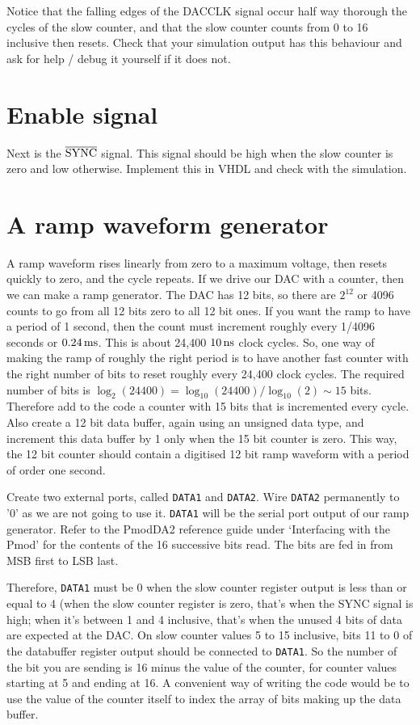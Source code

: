 \documentclass[../physical_computing.tex]{subfiles}
\begin{document}
Notice that the falling edges of the DACCLK signal occur half way thorough the cycles of the slow counter, and that the slow counter counts from 0 to 16 inclusive then resets. Check that your simulation output has this behaviour and ask for help / debug it yourself if it does not.

\section{Enable signal}
\label{sec:enable}

Next is the $\rm \overline{SYNC}$ signal. This signal should be high when the slow counter is zero and low otherwise. Implement this in VHDL and check with the simulation.

\section{A ramp waveform generator}
\label{sec:databuffer}

A ramp waveform rises linearly from zero to a maximum voltage, then resets quickly to 
zero, and the cycle repeats. If we drive our DAC with a counter, then we can make a ramp generator. The DAC has 12 bits, so there are $2^{12}$ or 4096 counts to go from all 12 bits zero to all 12 bit ones. If you want the ramp to have a period of 1 second, then the count must increment roughly every 1/4096 seconds or $\rm 0.24\,ms$. This is about 24,400 $\rm 10\,ns$ clock cycles. So, one way of making the ramp of roughly the right period is to have another fast counter with the right number of bits to reset roughly every 24,400 clock cycles. The required number of bits is $\log_2(24400)=\log_{10}(24400)/\log_{10}(2)\sim15$ bits. Therefore add to the code a
counter with 15 bits that is incremented every cycle. Also create a 12 bit data buffer, again using an unsigned data type, and increment this data buffer by 1 only when the 15 bit counter is zero. This way, the 12 bit counter should contain a digitised 12 bit ramp waveform with a period of order one second. 

Create two external ports, called \texttt{DATA1} and \texttt{DATA2}. Wire 
\texttt{DATA2} permanently to '0' as we are not going to use it. \texttt{DATA1} will
be the serial port output of our ramp generator. Refer to the PmodDA2 reference 
guide under `Interfacing with the Pmod' for the contents of the 16 successive 
bits read. The bits are fed in from MSB first to LSB last.

Therefore, \texttt{DATA1} must be 0 when the slow counter register output is less than or equal to 4 (when the slow counter register is zero, that's when the SYNC signal is high; when it's between 1 and 4 inclusive, that's when the unused 4 bits of data are expected at the DAC. On slow counter values 5 to 15 inclusive, bits
11 to 0 of the databuffer register output should be connected to \texttt{DATA1}. So
the number of the bit you are sending is 16 minus the value of the counter, for
counter values starting at 5 and ending at 16. A 
convenient way of writing the code would be to use the value of the counter itself
to index the array of bits making up the data buffer.
\end{document}

